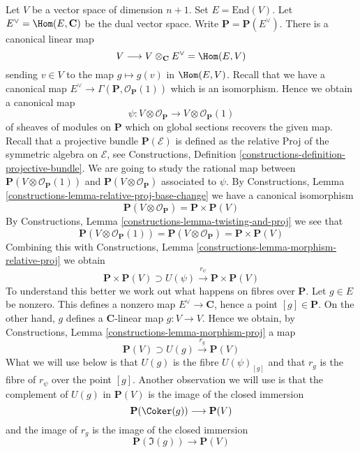 \noindent
Let $V$ be a vector space of dimension $n + 1$. Set $E = \text{End}(V)$.
Let $E^\vee = \Hom(E, \mathbf{C})$ be the dual vector space.
Write $\mathbf{P} = \mathbf{P}(E^\vee)$.
There is a canonical linear map
$$
V \longrightarrow V \otimes_\mathbf{C} E^\vee = \Hom(E, V)
$$
sending $v \in V$ to the map $g \mapsto g(v)$ in $\Hom(E, V)$.
Recall that we have a canonical map
$E^\vee \to \Gamma(\mathbf{P}, \mathcal{O}_\mathbf{P}(1))$
which is an isomorphism. Hence we obtain a canonical map
$$
\psi : V \otimes \mathcal{O}_\mathbf{P} \to V \otimes \mathcal{O}_\mathbf{P}(1)
$$
of sheaves of modules on $\mathbf{P}$ which on global sections recovers
the given map. Recall that a projective bundle $\mathbf{P}(\mathcal{E})$
is defined as the relative Proj of the symmetric algebra on $\mathcal{E}$, see
Constructions, Definition \ref{constructions-definition-projective-bundle}.
We are going to study the rational
map between $\mathbf{P}(V \otimes \mathcal{O}_\mathbf{P}(1))$ and
$\mathbf{P}(V \otimes \mathcal{O}_\mathbf{P})$ associated to $\psi$. By
Constructions, Lemma \ref{constructions-lemma-relative-proj-base-change}
we have a canonical isomorphism
$$
\mathbf{P}(V \otimes \mathcal{O}_\mathbf{P}) = \mathbf{P} \times \mathbf{P}(V)
$$
By Constructions, Lemma \ref{constructions-lemma-twisting-and-proj}
we see that
$$
\mathbf{P}(V \otimes \mathcal{O}_\mathbf{P}(1)) =
\mathbf{P}(V \otimes \mathcal{O}_\mathbf{P}) = \mathbf{P} \times \mathbf{P}(V)
$$
Combining this with
Constructions, Lemma \ref{constructions-lemma-morphism-relative-proj}
we obtain
\begin{equation}
\label{equation-r-psi}
\mathbf{P} \times \mathbf{P}(V) \supset
U(\psi) \xrightarrow{r_\psi} \mathbf{P} \times \mathbf{P}(V)
\end{equation}
To understand this better we work out what happens on fibres over
$\mathbf{P}$. Let $g \in E$ be nonzero. This defines a nonzero map
$E^\vee \to \mathbf{C}$, hence a point $[g] \in \mathbf{P}$.
On the other hand, $g$ defines a $\mathbf{C}$-linear map $g : V \to V$.
Hence we obtain, by
Constructions, Lemma \ref{constructions-lemma-morphism-proj}
a map
$$
\mathbf{P}(V) \supset U(g) \xrightarrow{r_g} \mathbf{P}(V)
$$
What we will use below is that $U(g)$ is the fibre $U(\psi)_{[g]}$ and
that $r_g$ is the fibre of $r_\psi$ over the point $[g]$. Another observation
we will use is that the complement of $U(g)$ in $\mathbf{P}(V)$ is
the image of the closed immersion
$$
\mathbf{P}(\Coker(g)) \longrightarrow \mathbf{P}(V)
$$
and the image of $r_g$ is the image of the closed immersion
$$
\mathbf{P}(\Im(g)) \longrightarrow \mathbf{P}(V)
$$

